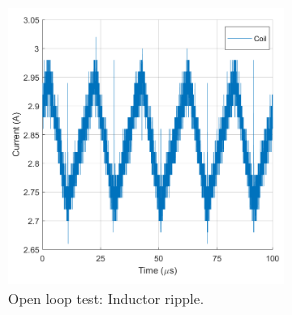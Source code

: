\begin{figure}[H]
	\begin{center}
		\includegraphics[width=0.65\textwidth]{../Pictures/P1/Test/Openloopinductor}
		\caption{Open loop test: Inductor ripple.}
		\label{Openlooptestinductor}
	\end{center}	
\end{figure}